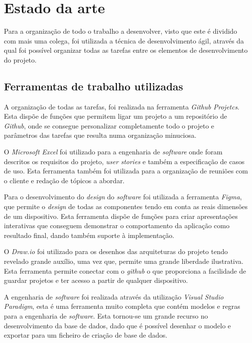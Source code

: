 
\chapter{Estado da arte}
Para a organização de todo o trabalho a desenvolver, visto que este é dividido com mais uma colega, foi utilizada a técnica de desenvolvimento ágil, através da qual foi possível organizar todas as tarefas entre os elementos de desenvolvimento do projeto.

\section{Ferramentas de trabalho utilizadas}

A organização de todas as tarefas, foi realizada na ferramenta \textit{Github Projetcs}. Esta dispõe de funções que permitem ligar um projeto a um repositório de \textit{Github}, onde se consegue personalizar completamente todo o projeto e parâmetros das tarefas que resulta numa organização minuciosa.

O \textit{Microsoft Excel} foi utilizado para a engenharia de \textit{software} onde foram descritos os requisitos do projeto, \textit{user stories} e também a especificação de casos de uso. Esta ferramenta também foi utilizada para a organização de reuniões com o cliente e redação de tópicos a abordar.

Para o desenvolvimento do \textit{design} do \textit{software} foi utilizada a ferramenta \textit{Figma}, que permite o \textit{design} de todas as componentes tendo em conta as reais dimensões de um dispositivo. Esta ferramenta dispõe de funções para criar apresentações interativas que conseguem demonstrar o comportamento da aplicação como resultado final, dando também suporte à implementação.

O \textit{Draw.io} foi utilizado para os desenhos das arquiteturas do projeto tendo revelado grande auxílio, uma vez que, permite uma grande liberdade ilustrativa. Esta ferramenta permite conectar com o \textit{github} o que proporciona a facilidade de guardar projetos e ter acesso a partir de qualquer dispositivo.

A engenharia de \textit{software} foi realizada através da utilização \textit{Visual Studio Paradigm}, esta é uma ferramenta muito completa que contém modelos e regras para a engenharia de \textit{software}. Esta tornou-se um grande recurso no desenvolvimento da base de dados, dado que é possível desenhar o modelo e exportar para um ficheiro de criação de base de dados.

